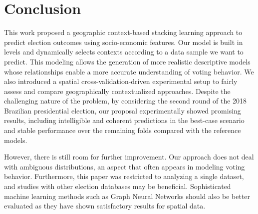 \documentclass[runningheads]{llncs}
\begin{document}
\section{Conclusion}
\label{sec:conclusion}

This work proposed a geographic context-based stacking learning approach to predict election outcomes using socio-economic features. Our model is built in levels and dynamically selects contexts according to a data sample we want to predict. This modeling allows the generation of more realistic descriptive models whose relationships enable a more accurate understanding of voting behavior. We also introduced a spatial cross-validation-driven experimental setup to fairly assess and compare geographically contextualized approaches. Despite the challenging nature of the problem, by considering the second round of the 2018 Brazilian presidential election, our proposal experimentally showed promising results, including intelligible and coherent predictions in the best-case scenario and stable performance over the remaining folds compared with the reference models.

However, there is still room for further improvement. Our approach does not deal with ambiguous distributions, an aspect that often appears in modeling voting behavior. Furthermore, this paper was restricted to analyzing a single dataset, and studies with other election databases may be beneficial. Sophisticated machine learning methods such as Graph Neural Networks should also be better evaluated as they have shown satisfactory results for spatial data.


%
%


%
\end{document}
